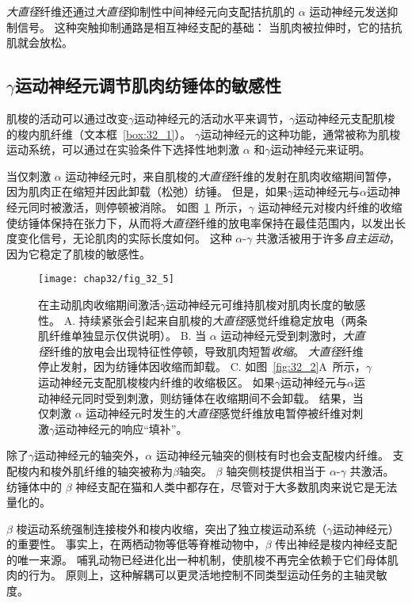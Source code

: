 \textit{大直径}纤维还通过\textit{大直径}抑制性中间神经元向支配拮抗肌的 $ \alpha $ 运动神经元发送抑制信号。
这种突触抑制通路是相互神经支配的基础：
当肌肉被拉伸时，它的拮抗肌就会放松。



\subsection{$ \gamma $运动神经元调节肌肉纺锤体的敏感性}

肌梭的活动可以通过改变$ \gamma $运动神经元的活动水平来调节，$ \gamma $运动神经元支配肌梭的梭内肌纤维（文本框~\ref{box:32_1}）。
$ \gamma $运动神经元的这种功能，通常被称为肌梭运动系统，可以通过在实验条件下选择性地刺激 $ \alpha $ 和$ \gamma $运动神经元来证明。


当仅刺激 $ \alpha $ 运动神经元时，来自肌梭的\textit{大直径}纤维的发射在肌肉收缩期间暂停，因为肌肉正在缩短并因此卸载（松弛）纺锤。
但是，如果$ \gamma $运动神经元与$ \alpha $运动神经元同时被激活，则停顿被消除。
如图~\ref{fig:32_5}~所示，$ \gamma $ 运动神经元对梭内纤维的收缩使纺锤体保持在张力下，从而将\textit{大直径}纤维的放电率保持在最佳范围内，以发出长度变化信号，无论肌肉的实际长度如何。
这种 $ \alpha $-$ \gamma $ 共激活被用于许多\textit{自主运动}，因为它稳定了肌梭的敏感性。


\begin{figure}[htbp]
	\centering
	\texttt{[image: chap32/fig\_32\_5]}
	\caption{在主动肌肉收缩期间激活$ \gamma $运动神经元可维持肌梭对肌肉长度的敏感性\cite{hunt1951stretch}。
	A. 持续紧张会引起来自肌梭的\textit{大直径}感觉纤维稳定放电（两条肌纤维单独显示仅供说明）。
	B. 当 $ \alpha $ 运动神经元受到刺激时，\textit{大直径}纤维的放电会出现特征性停顿，导致肌肉短暂\textit{收缩}。
	\textit{大直径}纤维停止发射，因为纺锤体因收缩而卸载。
	C. 如图~\ref{fig:32_2}A~所示，$ \gamma $运动神经元支配肌梭梭内纤维的收缩极区。
	如果$ \gamma $运动神经元与$ \alpha $运动神经元同时受到刺激，则纺锤体在收缩期间不会卸载。
	结果，当仅刺激 $ \alpha $ 运动神经元时发生的\textit{大直径}感觉纤维放电暂停被纤维对刺激$ \gamma $运动神经元的响应“填补”。}
	\label{fig:32_5}
\end{figure}


除了$ \gamma $运动神经元的轴突外，$ \alpha $ 运动神经元轴突的侧枝有时也会支配梭内纤维。
支配梭内和梭外肌纤维的轴突被称为$\beta$轴突。
$ \beta $ 轴突侧枝提供相当于 $ \alpha $-$ \gamma $ 共激活。
纺锤体中的 $ \beta $ 神经支配在猫和人类中都存在，尽管对于大多数肌肉来说它是无法量化的。


$ \beta $ 梭运动系统强制连接梭外和梭内收缩，突出了独立梭运动系统（$ \gamma $运动神经元）的重要性。
事实上，在两栖动物等低等脊椎动物中，$ \beta $ 传出神经是梭内神经支配的唯一来源。
哺乳动物已经进化出一种机制，使肌梭不再完全依赖于它们母体肌肉的行为。
原则上，这种解耦可以更灵活地控制不同类型运动任务的主轴灵敏度。


